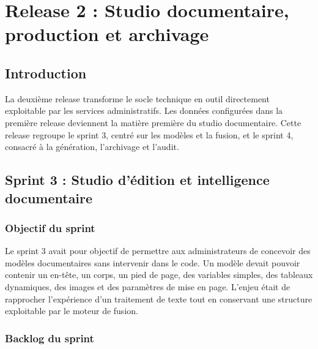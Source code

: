 
\chapter{Release 2 : Studio documentaire, production et archivage}

\section{Introduction}

La deuxième release transforme le socle technique en outil directement exploitable par les services administratifs. Les données configurées dans la première release deviennent la matière première du studio documentaire. Cette release regroupe le sprint 3, centré sur les modèles et la fusion, et le sprint 4, consacré à la génération, l'archivage et l'audit.

\section{Sprint 3 : Studio d'édition et intelligence documentaire}

\subsection{Objectif du sprint}

Le sprint 3 avait pour objectif de permettre aux administrateurs de concevoir des modèles documentaires sans intervenir dans le code. Un modèle devait pouvoir contenir un en-tête, un corps, un pied de page, des variables simples, des tableaux dynamiques, des images et des paramètres de mise en page. L'enjeu était de rapprocher l'expérience d'un traitement de texte tout en conservant une structure exploitable par le moteur de fusion.

\subsection{Backlog du sprint}

\renewcommand{\arraystretch}{1.4}

